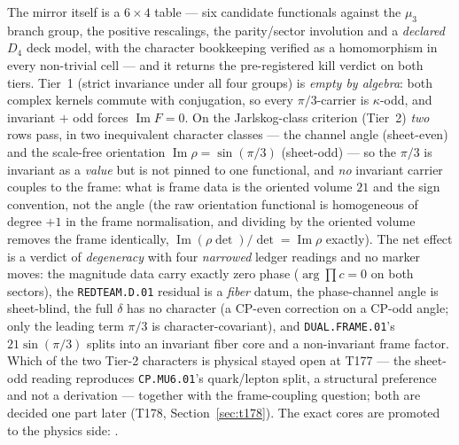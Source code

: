 \documentclass[11pt,a4paper]{article}
\begin{document}
\noindent The mirror itself is a $6\times4$ table --- six candidate functionals against the
$\mu_3$ branch group, the positive rescalings, the parity/sector involution and a
\emph{declared} $D_4$ deck model, with the character bookkeeping verified as a homomorphism
in every non-trivial cell --- and it returns the pre-registered kill verdict on both tiers.
Tier~1 (strict invariance under all four groups) is \emph{empty by algebra}: both complex
kernels commute with conjugation, so every $\pi/3$-carrier is $\kappa$-odd, and invariant
$+$ odd forces $\operatorname{Im}F=0$. On the Jarlskog-class criterion (Tier~2) \emph{two}
rows pass, in two inequivalent character classes --- the channel angle (sheet-even) and the
scale-free orientation $\operatorname{Im}\rho=\sin(\pi/3)$ (sheet-odd) --- so the $\pi/3$ is
invariant as a \emph{value} but is not pinned to one functional, and \emph{no} invariant
carrier couples to the frame: what is frame data is the oriented volume $21$ and the sign
convention, not the angle (the raw orientation functional is homogeneous of degree $+1$ in
the frame normalisation, and dividing by the oriented volume removes the frame identically,
$\operatorname{Im}(\rho\det)/\det=\operatorname{Im}\rho$ exactly). The net effect is a
verdict of \emph{degeneracy} with four \emph{narrowed} ledger readings and no marker moves:
the magnitude data carry exactly zero phase ($\arg\prod c=0$ on both sectors), the
\texttt{REDTEAM.D.01} residual is a \emph{fiber} datum, the phase-channel angle is
sheet-blind, the full $\delta$ has no character (a CP-even correction on a CP-odd angle;
only the leading term $\pi/3$ is character-covariant), and \texttt{DUAL.FRAME.01}'s
$21\sin(\pi/3)$ splits into an invariant fiber core and a non-invariant frame factor. Which
of the two Tier-2 characters is physical stayed open at T177 --- the sheet-odd reading reproduces
\texttt{CP.MU6.01}'s quark/lepton split, a structural preference and not a derivation ---
together with the frame-coupling question; both are decided one part later
(T178, Section~\ref{sec:t178}). The exact cores are promoted to the physics
side: .
\end{document}
